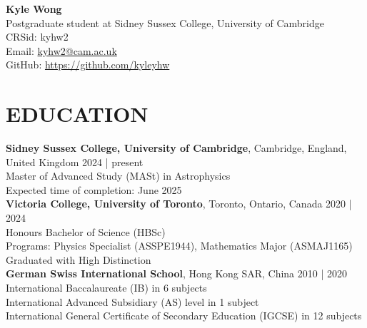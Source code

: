 \documentclass[a4paper,10pt]{extarticle}
\begin{document}
\pagestyle{fancy}
\renewcommand{\headrulewidth}{0pt}
\fancyhead{}
\fancyhead[R]{\textit{\monthyeardate\today}}
\thispagestyle{empty} %

\begin{flushleft}
\textbf{\LARGE Kyle Wong}\\[2pt] %
Postgraduate student at Sidney Sussex College, University of Cambridge
\\ {CRSid: kyhw2} 
\\ Email: \href{mailto:kyhw2@cam.ac.uk}{kyhw2@cam.ac.uk} %
\\ GitHub: \url{https://github.com/kyleyhw}
\end{flushleft}

\section*{EDUCATION}
\textbf{Sidney Sussex College, University of Cambridge}, Cambridge, England, United Kingdom \hfill 2024 | present\\
Master of Advanced Study (MASt) in Astrophysics\\
Expected time of completion: June 2025\\



\textbf{Victoria College, University of Toronto}, Toronto, Ontario, Canada \hfill 2020 | 2024\\ %
Honours Bachelor of Science (HBSc)\\
Programs: Physics Specialist (ASSPE1944), Mathematics Major (ASMAJ1165)\\ 
Graduated with High Distinction\\


\textbf{German Swiss International School}, Hong Kong SAR, China \hfill 2010 | 2020\\ %
International Baccalaureate (IB) in 6 subjects\\
International Advanced Subsidiary (AS) level in 1 subject\\
International General Certificate of Secondary Education (IGCSE) in 12 subjects

\end{document}
